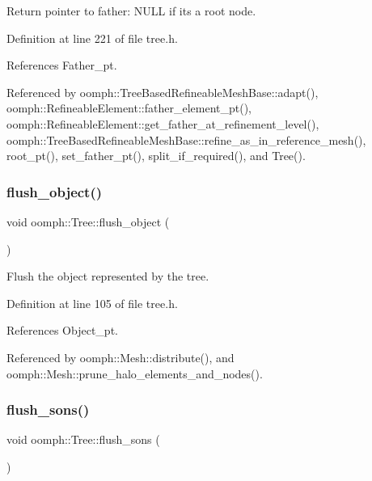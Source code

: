 Return pointer to father\+: N\+U\+LL if it\textquotesingle{}s a root node. 



Definition at line 221 of file tree.\+h.



References Father\+\_\+pt.



Referenced by oomph\+::\+Tree\+Based\+Refineable\+Mesh\+Base\+::adapt(), oomph\+::\+Refineable\+Element\+::father\+\_\+element\+\_\+pt(), oomph\+::\+Refineable\+Element\+::get\+\_\+father\+\_\+at\+\_\+refinement\+\_\+level(), oomph\+::\+Tree\+Based\+Refineable\+Mesh\+Base\+::refine\+\_\+as\+\_\+in\+\_\+reference\+\_\+mesh(), root\+\_\+pt(), set\+\_\+father\+\_\+pt(), split\+\_\+if\+\_\+required(), and Tree().

\mbox{\label{classoomph_1_1Tree_a96a95bd9942e906fde87194845a1868c}} 
\subsubsection{\texorpdfstring{flush\+\_\+object()}{flush\_object()}}
{\footnotesize\ttfamily void oomph\+::\+Tree\+::flush\+\_\+object (\begin{DoxyParamCaption}{ }\end{DoxyParamCaption})\hspace{0.3cm}{\ttfamily [inline]}}



Flush the object represented by the tree. 



Definition at line 105 of file tree.\+h.



References Object\+\_\+pt.



Referenced by oomph\+::\+Mesh\+::distribute(), and oomph\+::\+Mesh\+::prune\+\_\+halo\+\_\+elements\+\_\+and\+\_\+nodes().

\mbox{\label{classoomph_1_1Tree_a34df656d2f298dbbdf60e7890a3dff2f}} 
\subsubsection{\texorpdfstring{flush\+\_\+sons()}{flush\_sons()}}
{\footnotesize\ttfamily void oomph\+::\+Tree\+::flush\+\_\+sons (\begin{DoxyParamCaption}{ }\end{DoxyParamCaption})\hspace{0.3cm}{\ttfamily [inline]}}



